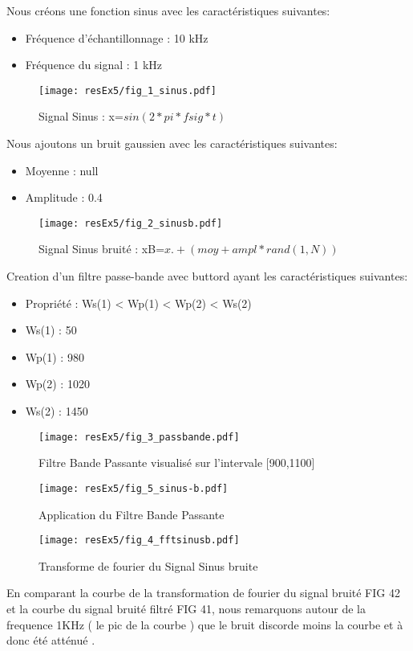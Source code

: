 Nous créons une fonction sinus avec les caractéristiques suivantes:\\
\begin{itemize}
\item Fréquence d'échantillonnage : 10 kHz
\item Fréquence du signal : 1 kHz 
\end{itemize}


\begin{figure}[H]
\centering
\texttt{[image: resEx5/fig\_1\_sinus.pdf]}
\caption{Signal Sinus : x=$sin(2*pi*fsig*t)$}
\end{figure}


Nous ajoutons un bruit gaussien avec les caractéristiques suivantes:\\
\begin{itemize}
\item Moyenne : null
\item Amplitude : 0.4
\end{itemize}

\begin{figure}[H]
\centering
\texttt{[image: resEx5/fig\_2\_sinusb.pdf]}
\caption{Signal Sinus bruité : xB=$ x .+ (moy + ampl*rand(1,N))$}
\end{figure}


Creation d'un filtre passe-bande avec buttord ayant les caractéristiques suivantes:\\
\begin{itemize}
\item Propriété : Ws(1) < Wp(1) < Wp(2) < Ws(2)
\item Ws(1) : 50 
\item Wp(1) : 980 
\item Wp(2) : 1020 
\item Ws(2) : 1450 
\end{itemize}


\begin{figure}[H]
\centering
\texttt{[image: resEx5/fig\_3\_passbande.pdf]}
\caption{Filtre Bande Passante visualisé sur l'intervale [900,1100]}
\end{figure}


\begin{figure}[H]
\centering
\texttt{[image: resEx5/fig\_5\_sinus-b.pdf]}
\caption{Application du Filtre Bande Passante}
\end{figure}


\begin{figure}[H]
\centering
\texttt{[image: resEx5/fig\_4\_fftsinusb.pdf]}
\caption{Transforme de fourier du Signal Sinus bruite}
\end{figure}


En comparant la courbe de la transformation de fourier du signal bruité FIG 42 et la courbe du signal bruité filtré FIG 41, nous remarquons autour de la frequence 1KHz ( le pic de la courbe ) que le bruit discorde moins la courbe et à donc été atténué .


